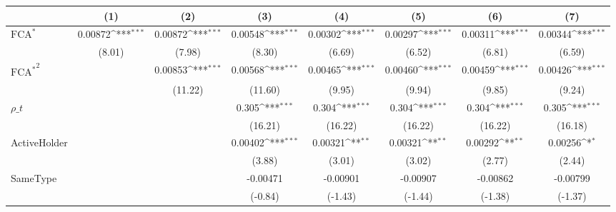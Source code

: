 {
\def\sym#1{\ifmmode^{#1}\else\(^{#1}\)\fi}
\begin{tabular}{l*{7}{c}}
\hline\hline
                    &\multicolumn{1}{c}{(1)}         &\multicolumn{1}{c}{(2)}         &\multicolumn{1}{c}{(3)}         &\multicolumn{1}{c}{(4)}         &\multicolumn{1}{c}{(5)}         &\multicolumn{1}{c}{(6)}         &\multicolumn{1}{c}{(7)}         \\
\hline
$ \text{FCA}^* $    &     0.00872\sym{***}&     0.00872\sym{***}&     0.00548\sym{***}&     0.00302\sym{***}&     0.00297\sym{***}&     0.00311\sym{***}&     0.00344\sym{***}\\
                    &      (8.01)         &      (7.98)         &      (8.30)         &      (6.69)         &      (6.52)         &      (6.81)         &      (6.59)         \\
[1em]
 $ { \text{FCA} ^ * } ^2 $&                     &     0.00853\sym{***}&     0.00568\sym{***}&     0.00465\sym{***}&     0.00460\sym{***}&     0.00459\sym{***}&     0.00426\sym{***}\\
                    &                     &     (11.22)         &     (11.60)         &      (9.95)         &      (9.94)         &      (9.85)         &      (9.24)         \\
[1em]
$ \rho\_t $          &                     &                     &       0.305\sym{***}&       0.304\sym{***}&       0.304\sym{***}&       0.304\sym{***}&       0.305\sym{***}\\
                    &                     &                     &     (16.21)         &     (16.22)         &     (16.22)         &     (16.22)         &     (16.18)         \\
[1em]
ActiveHolder        &                     &                     &     0.00402\sym{***}&     0.00321\sym{**} &     0.00321\sym{**} &     0.00292\sym{**} &     0.00256\sym{*}  \\
                    &                     &                     &      (3.88)         &      (3.01)         &      (3.02)         &      (2.77)         &      (2.44)         \\
[1em]
SameType            &                     &                     &    -0.00471         &    -0.00901         &    -0.00907         &    -0.00862         &    -0.00799         \\
                    &                     &                     &     (-0.84)         &     (-1.43)         &     (-1.44)         &     (-1.38)         &     (-1.37)         \\

\end{tabular}}
